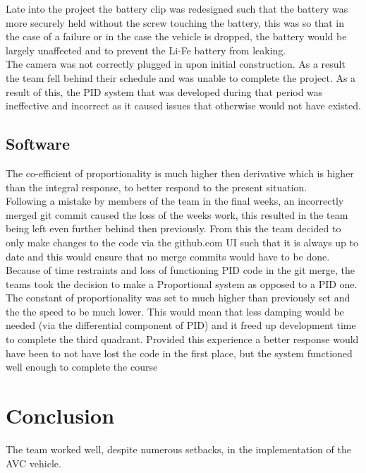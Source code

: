 \documentclass[paper=a4, fontsize=11pt]{scrartcl} %
\numberwithin{equation}{section} %
\numberwithin{figure}{section} %
\begin{document}
Late into the project the battery clip was redesigned such that the battery was
more securely held without the screw touching the battery, this was so that in
the case of a failure or in the case the vehicle is dropped, the battery would
be largely unaffected and to prevent the Li-Fe battery from leaking.\\

The camera was not correctly plugged in upon initial construction.  As a result
the team fell behind their schedule and was unable to complete the project. 
As a result of this, the PID system that was developed during that period was
ineffective and incorrect as it caused issues that otherwise would not have
existed.\\

\subsection{Software}
The co-efficient of proportionality is much higher then derivative which is
higher than the integral response, to better respond to the present situation.\\

Following a mistake by members of the team in the final weeks, an incorrectly
merged git commit caused the loss of the weeks work, this resulted in the team
being left even further behind then previously. From this the team decided to
only make changes to the code via the github.com UI such that it is always up to
date and this would ensure that no merge commits would have to be done.\\

Because of time restraints and loss of functioning PID code in the git merge,
the teams took the decision to make a Proportional system as opposed to a PID
one. The constant of proportionality was set to much higher than previously set
and the the speed to be much lower. This would mean that less damping would be
needed (via the differential component of PID) and it freed up development time
to complete the third quadrant. Provided this experience a better response would
have been to not have lost the code in the first place, but the system
functioned well enough to complete the course\\

\section{Conclusion}
The team worked well, despite numerous setbacks, in the implementation of the
AVC vehicle.
\end{document}
